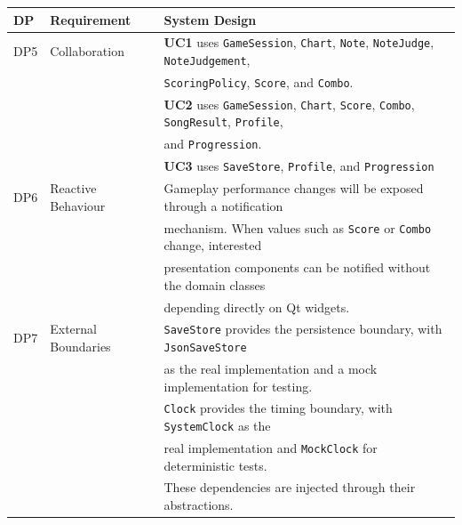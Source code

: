 \documentclass[12pt,a4paper]{article}
\begin{document}
\begin{table}[H]
\begin{tabular}{@{}lll@{}}
    \bottomrule
        \end{tabular}
    \end{table}

\pagebreak
    \begin{table}[H]
        \centering
        \small
        \begin{tabular}{@{}lll@{}}
        \toprule
        DP & Requirement & System Design \\
        \midrule

        DP5 &
        Collaboration &
        \textbf{UC1} uses \texttt{GameSession},
        \texttt{Chart}, \texttt{Note}, \texttt{NoteJudge},
        \texttt{NoteJudgement}, \\ & & \texttt{ScoringPolicy}, \texttt{Score},
        and \texttt{Combo}. \\ & & \textbf{UC2} uses
        \texttt{GameSession}, \texttt{Chart}, \texttt{Score},
        \texttt{Combo}, \texttt{SongResult}, \texttt{Profile}, \\ & & and
        \texttt{Progression}. \\ & & \textbf{UC3} uses
        \texttt{SaveStore}, \texttt{Profile}, and \texttt{Progression}\\

        \addlinespace

        DP6 &
        Reactive Behaviour &
        Gameplay performance changes will be exposed through a
        notification \\ & & mechanism. When values such as \texttt{Score} or
        \texttt{Combo} change, interested \\ & & presentation components can be
        notified without the domain classes\\ & &  depending directly on Qt
        widgets. \\

        \addlinespace

        DP7 &
        External Boundaries &
        \texttt{SaveStore} provides the persistence boundary, with
        \texttt{JsonSaveStore} \\ & & as the real implementation and a mock
        implementation for testing. \\ & & \texttt{Clock} provides the timing
        boundary, with \texttt{SystemClock} as the \\ & & real implementation
        and \texttt{MockClock} for deterministic tests. \\ & & These
        dependencies are injected through their abstractions. \\


\end{tabular}
\end{table}
\end{document}
